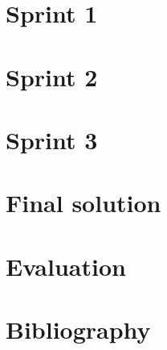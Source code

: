 \documentclass[11pt,a4paper,titlepage,oneside]{report}
\begin{document}
\chapter{Sprint 1}

\chapter{Sprint 2}

\chapter{Sprint 3}

\chapter{Final solution}

\chapter{Evaluation}



\chapter{Bibliography}
\begin{flushleft}
	
\end{flushleft}

\appendix
\end{document}
